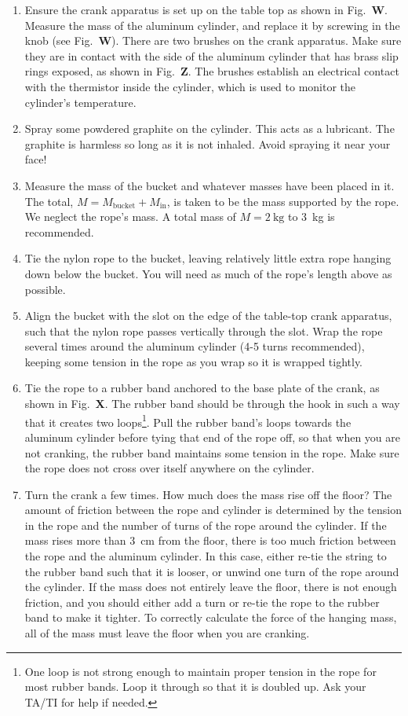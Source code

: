 \documentclass[addpoints]{physlabs}
\begin{document}
\begin{labsection}
\begin{experiment}
\begin{enumerate}
    \item Ensure the crank apparatus is set up on the table top as shown in Fig.~{\bf W}. Measure the mass of the aluminum cylinder, and replace it by screwing in the knob (see Fig.~{\bf W}). There are two brushes on the crank apparatus. Make sure they are in contact with the side of the aluminum cylinder that has brass slip rings exposed, as shown in Fig.~{\bf Z}. The brushes establish an electrical contact with the thermistor inside the cylinder, which is used to monitor the cylinder's temperature.
    \item Spray some powdered graphite on the cylinder. This acts as a lubricant. The graphite is harmless so long as it is not inhaled. Avoid spraying it near your face!
    \item Measure the mass of the bucket and whatever masses have been placed in it. The total, $M=M_\text{bucket}+M_\text{in}$, is taken to be the mass supported by the rope. We neglect the rope's mass. A total mass of $M=\qty{2}{\kilo\gram}$ to \qty{3}{\kilo\gram} is recommended.
    \item Tie the nylon rope to the bucket, leaving relatively little extra rope hanging down below the bucket. You will need as much of the rope's length above as possible.
    \item Align the bucket with the slot on the edge of the table-top crank apparatus, such that the nylon rope passes vertically through the slot. Wrap the rope several times around the aluminum cylinder (4-5 turns recommended), keeping some tension in the rope as you wrap so it is wrapped tightly.
    \item Tie the rope to a rubber band anchored to the base plate of the crank, as shown in Fig.~{\bf X}. The rubber band should be through the hook in such a way that it creates two loops\footnote{One loop is not strong enough to maintain proper tension in the rope for most rubber bands. Loop it through so that it is doubled up. Ask your TA/TI for help if needed.}. Pull the rubber band's loops towards the aluminum cylinder before tying that end of the rope off, so that when you are not cranking, the rubber band maintains some tension in the rope. Make sure the rope does not cross over itself anywhere on the cylinder.
    \item Turn the crank a few times. How much does the mass rise off the floor? The amount of friction between the rope and cylinder is determined by the tension in the rope and the number of turns of the rope around the cylinder. If the mass rises more than \qty{3}{\centi\meter} from the floor, there is too much friction between the rope and the aluminum cylinder. In this case, either re-tie the string to the rubber band such that it is looser, or unwind one turn of the rope around the cylinder. If the mass does not entirely leave the floor, there is not enough friction, and you should either add a turn or re-tie the rope to the rubber band to make it tighter. To correctly calculate the force of the hanging mass, all of the mass must leave the floor when you are cranking.

\end{enumerate}
\end{experiment}
\end{labsection}
\end{document}

